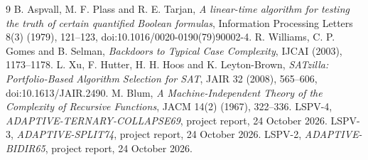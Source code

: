 \documentclass[11pt]{article}
\begin{document}
\begin{thebibliography}{9}
 B. Aspvall, M. F. Plass and R. E. Tarjan,
\emph{A linear-time algorithm for testing the truth of certain quantified
Boolean formulas}, Information Processing Letters 8(3) (1979), 121--123,
doi:10.1016/0020-0190(79)90002-4.
 R. Williams, C. P. Gomes and B. Selman,
\emph{Backdoors to Typical Case Complexity}, IJCAI (2003), 1173--1178.
 L. Xu, F. Hutter, H. H. Hoos and K. Leyton-Brown,
\emph{SATzilla: Portfolio-Based Algorithm Selection for SAT}, JAIR 32
(2008), 565--606, doi:10.1613/JAIR.2490.
 M. Blum, \emph{A Machine-Independent Theory of the Complexity
of Recursive Functions}, JACM 14(2) (1967), 322--336.
 LSPV-4, \emph{ADAPTIVE-TERNARY-COLLAPSE69}, project report,
24 October 2026.
 LSPV-3, \emph{ADAPTIVE-SPLIT74}, project report,
24 October 2026.
 LSPV-2, \emph{ADAPTIVE-BIDIR65}, project report,
24 October 2026.
\end{thebibliography}
\end{document}

